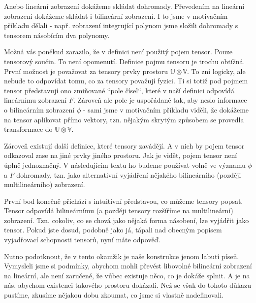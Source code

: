 \documentclass[a5paper,12pt]{amsbook}
\theoremstyle{definition}
\newcommand{\myspace}[1]{\mathbb{#1}}
\begin{document}
Anebo lineární zobrazení dokážeme skládat dohromady. Převedením na lineární zobrazení dokážeme
skládat i bilineární zobrazení. I to jsme v motivačním příkladu dělali - např. zobrazení integrující
polynom jsme složili dohromady s tensorem násobícím dva polynomy.

Možná vás poněkud zarazilo, že v definici není použitý pojem tensor. Pouze tensorový součin.
To není opomenutí. Definice pojmu tensoru je trochu obtížná. První možnost je považovat
za tensory prvky prostoru $\myspace{U}\otimes\myspace{V}$. To zní logicky, ale nebude to
odpovídat tomu, co za tensory považují fyzici. Ti si totiž pod pojmem tensor představují
ono zmiňované ``pole čísel``, které v naší definici odpovídá lineárnímu zobrazení $F$.
Zároveň ale pole je uspořádané tak, aby neslo informace o bilineárním zobrazení $\phi$
- sami jsme v motivačním příkladu viděli, že dokážeme na tensor aplikovat přímo vektory,
tzn. nějakým skrytým způsobem se provedla transformace do $\myspace{U}\otimes\myspace{V}$.

Zároveň existují další definice, které tensory zavádějí. A v nich by pojem tensor odkazoval
zase na jiné prvky jiného prostoru. Jak je vidět, pojem tensor není úplně jednoznačný.
V následujícím textu ho budeme používat volně ve významu $\phi$ a $F$ dohromady, tzn. jako
alternativní vyjádření nějakého bilineárního (později multilineárního) zobrazení.

První bod konečně přichází s intuitivní představou, co můžeme tensory popsat. Tensor odpovídá
bilineárnímu (a později tensory rozšíříme na multilineární) zobrazení. Tzn. cokoliv, co se
chová jako nějaká forma násobení, lze vyjádřit jako tensor. Pokud jste dosud, podobně jako já,
tápali nad obecným popisem vyjadřovací schopnosti tensorů, nyní máte odpověď.

Nutno podotknout, že v tento okamžik je naše konstrukce jenom labutí píseň. Vymysleli jsme si
podmínky, abychom mohli převést libovolné bilineární zobrazení na lineární, ale není zaručené,
že vůbec existuje něco, co je dokáže splnit. A je na nás, abychom existenci takového prostoru
dokázali. Než se však do tohoto důkazu pustíme, zkusíme nějakou dobu zkoumat, co jsme si
vlastně nadefinovali.
\end{document}
